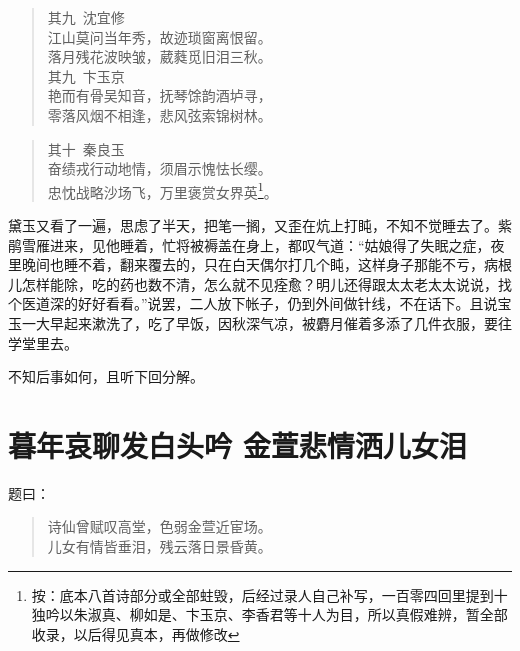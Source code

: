 \documentclass[12pt,oneside]{book}
\newenvironment{shici}{%
\begin{verse}%
\centering\large\hspace{12pt}}%
{\end{verse}}
\begin{document}
\begin{shici}
其九~沈宜修\\
江山莫问当年秀，故迹琐窗离恨留。\\
落月残花波映皱，葳蕤觅旧泪三秋。\\
其九~卞玉京\\
艳而有骨吴知音，抚琴馀韵酒垆寻，\\
零落风烟不相逢，悲风弦索锦树林。
\end{shici}

\begin{shici}
其十~秦良玉\\
奋绩戎行动地情，须眉示愧怯长缨。\\
忠忱战略沙场飞，万里褒赏女界英\footnote{按：底本八首诗部分或全部蛀毁，后经过录人自己补写，一百零四回里提到十独吟以朱淑真、柳如是、卞玉京、李香君等十人为目，所以真假难辨，暂全部收录，以后得见真本，再做修改}。
\end{shici}

黛玉又看了一遍，思虑了半天，把笔一搁，又歪在炕上打盹，不知不觉睡去了。紫鹃雪雁进来，见他睡着，忙将被褥盖在身上，都叹气道：“姑娘得了失眠之症，夜里晚间也睡不着，翻来覆去的，只在白天偶尔打几个盹，这样身子那能不亏，病根儿怎样能除，吃的药也数不清，怎么就不见痊愈？明儿还得跟太太老太太说说，找个医道深的好好看看。”说罢，二人放下帐子，仍到外间做针线，不在话下。且说宝玉一大早起来漱洗了，吃了早饭，因秋深气凉，被麝月催着多添了几件衣服，要往学堂里去。

不知后事如何，且听下回分解。
 
\chapter{暮年哀聊发白头吟 金萱悲情洒儿女泪}
题曰：

\begin{shici}
诗仙曾赋叹高堂，色弱金萱近宦场。\\
儿女有情皆垂泪，残云落日景昏黄。
\end{shici}
\end{document}
